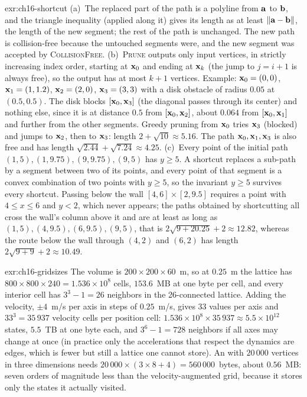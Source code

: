 \begin{solution}{exr:ch16-shortcut}
(a)~The replaced part of the path is a polyline from $\mathbf{a}$ to $\mathbf{b}$, and the triangle inequality (applied along it) gives its length as at least $\left\lVert \mathbf{a}-\mathbf{b} \right\rVert$, the length of the new segment; the rest of the path is unchanged. The new path is collision-free because the untouched segments were, and the new segment was accepted by \textsc{CollisionFree}. (b)~\textsc{Prune} outputs only input vertices, in strictly increasing index order, starting at $\mathbf{x}_0$ and ending at $\mathbf{x}_k$ (the jump to $j=i+1$ is always free), so the output has at most $k+1$ vertices. Example: $\mathbf{x}_0=(0,0)$, $\mathbf{x}_1=(1,1.2)$, $\mathbf{x}_2=(2,0)$, $\mathbf{x}_3=(3,3)$ with a disk obstacle of radius $0.05$ at $(0.5,0.5)$. The disk blocks $[\mathbf{x}_0,\mathbf{x}_3]$ (the diagonal passes through its center) and nothing else, since it is at distance $0.5$ from $[\mathbf{x}_0,\mathbf{x}_2]$, about $0.064$ from $[\mathbf{x}_0,\mathbf{x}_1]$ and further from the other segments. Greedy pruning from $\mathbf{x}_0$ tries $\mathbf{x}_3$ (blocked) and jumps to $\mathbf{x}_2$, then to $\mathbf{x}_3$: length $2+\sqrt{10}\approx5.16$. The path $\mathbf{x}_0,\mathbf{x}_1,\mathbf{x}_3$ is also free and has length $\sqrt{2.44}+\sqrt{7.24}\approx4.25$. (c)~Every point of the initial path $(1,5),(1,9.75),(9,9.75),(9,5)$ has $y\ge5$. A shortcut replaces a sub-path by a segment between two of its points, and every point of that segment is a convex combination of two points with $y\ge5$, so the invariant $y\ge5$ survives every shortcut. Passing below the wall $[4,6]\times[2,9.5]$ requires a point with $4\le x\le6$ and $y<2$, which never appears; the paths obtained by shortcutting all cross the wall's column above it and are at least as long as $(1,5),(4,9.5),(6,9.5),(9,5)$, that is $2\sqrt{9+20.25}+2\approx12.82$, whereas the route below the wall through $(4,2)$ and $(6,2)$ has length $2\sqrt{9+9}+2\approx10.49$.
\end{solution}

\begin{solution}{exr:ch16-gridsizes}
The volume is $200\times200\times60$~m, so at $0.25$~m the lattice has
$800\times800\times240=1.536\times10^{8}$ cells, $153.6$~MB at one byte per
cell, and every interior cell has $3^{3}-1=26$ neighbors in the
26-connected lattice. Adding the velocity, $\pm4$~m/s per axis in steps of
$0.25$~m/s, gives $33$ values per axis and $33^{3}=35\,937$ velocity cells
per position cell: $1.536\times10^{8}\times35\,937\approx5.5\times10^{12}$
states, $5.5$~TB at one byte each, and $3^{6}-1=728$ neighbors if all axes
may change at once (in practice only the accelerations that respect the
dynamics are edges, which is fewer but still a lattice one cannot store).
An \rrt with $20\,000$ vertices in three dimensions needs
$20\,000\times(3\times8+4)=560\,000$~bytes, about $0.56$~MB: seven orders of
magnitude less than the velocity-augmented grid, because it stores only the
states it actually visited.
\end{solution}

